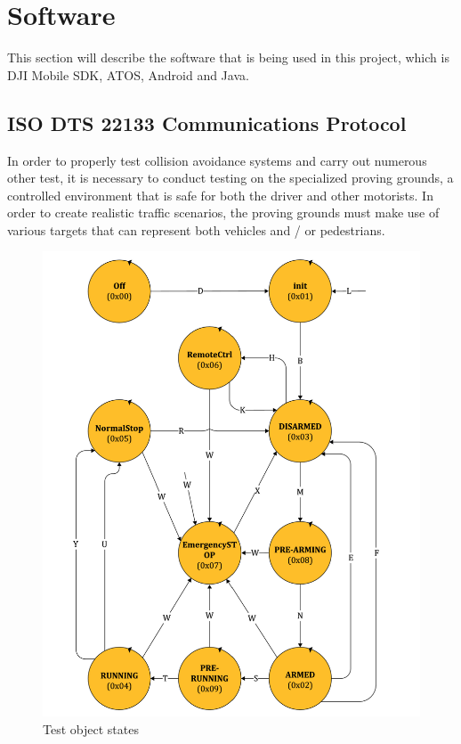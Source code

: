 \section{Software} \label{Software}
This section will describe the software that is being used in this project, which is DJI Mobile SDK, ATOS, Android and Java.


\subsection{ISO DTS 22133 Communications Protocol} \label{ISO}
In order to properly test collision avoidance systems and carry out numerous other test, it is necessary to conduct testing on the specialized proving grounds, a controlled environment that is safe for both the driver and other motorists. In order to create realistic traffic scenarios, the proving grounds must make use of various targets that can represent both vehicles and / or pedestrians.

\begin{figure}[!h]
  \centering
  \includegraphics[scale=0.6]{figure/Olika_states.png}
  \caption{Test object states}
  \label{fig:iso_states}
\end{figure}

